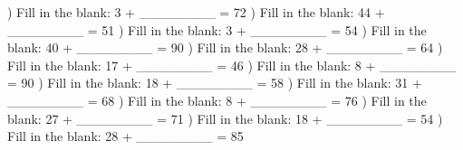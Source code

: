 \documentclass{article}%
\begin{document}
\newline%
\newline%
) Fill in the blank: 3 + \_\_\_\_\_\_\_\_ = 72%
\newline%
\newline%
) Fill in the blank: 44 + \_\_\_\_\_\_\_\_ = 51%
\newline%
\newline%
) Fill in the blank: 3 + \_\_\_\_\_\_\_\_ = 54%
\newline%
\newline%
) Fill in the blank: 40 + \_\_\_\_\_\_\_\_ = 90%
\newline%
\newline%
) Fill in the blank: 28 + \_\_\_\_\_\_\_\_ = 64%
\newline%
\newline%
) Fill in the blank: 17 + \_\_\_\_\_\_\_\_ = 46%
\newline%
\newline%
) Fill in the blank: 8 + \_\_\_\_\_\_\_\_ = 90%
\newline%
\newline%
) Fill in the blank: 18 + \_\_\_\_\_\_\_\_ = 58%
\newline%
\newline%
) Fill in the blank: 31 + \_\_\_\_\_\_\_\_ = 68%
\newline%
\newline%
) Fill in the blank: 8 + \_\_\_\_\_\_\_\_ = 76%
\newline%
\newline%
) Fill in the blank: 27 + \_\_\_\_\_\_\_\_ = 71%
\newline%
\newline%
) Fill in the blank: 18 + \_\_\_\_\_\_\_\_ = 54%
\newline%
\newline%
) Fill in the blank: 28 + \_\_\_\_\_\_\_\_ = 85%
\end{document}
